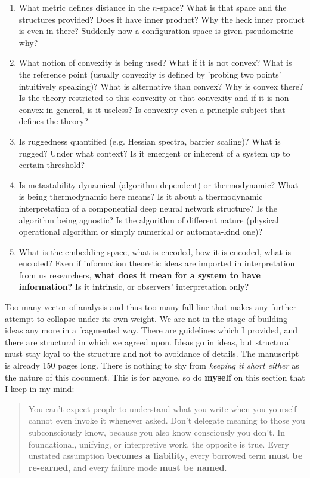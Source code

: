 \begin{enumerate}[itemsep=1pt,topsep=1pt]
    \item What metric defines distance in the $n$-space? What is that space and the structures provided? Does it have inner product? Why the heck inner product is even in there? Suddenly now a configuration space is given pseudometric - why? 
    \item What notion of convexity is being used? What if it is not convex? What is the reference point (usually convexity is defined by 'probing two points' intuitively speaking)? What is alternative than convex? Why is convex there? Is the theory restricted to this convexity or that convexity and if it is non-convex in general, is it useless? Is convexity even a principle subject that defines the theory?
    \item Is ruggedness quantified (e.g. Hessian spectra, barrier scaling)? What is rugged? Under what context? Is it emergent or inherent of a system up to certain threshold?
    \item Is metastability dynamical (algorithm-dependent) or thermodynamic? What is being thermodynamic here means? Is it about a thermodynamic interpretation of a componential deep neural network structure? Is the algorithm being agnostic? Is the algorithm of different nature (physical operational algorithm or simply numerical or automata-kind one)?
    \item What is the embedding space, what is encoded, how it is encoded, what is encoded? Even if information theoretic ideas are imported in interpretation from us researchers, \textbf{what does it mean for a system to have information?} Is it intrinsic, or observers' interpretation only? 
\end{enumerate}

Too many vector of analysis and thus too many fall-line that makes any further attempt to collapse under its own weight. We are not in the stage of building ideas any more in a fragmented way. There are guidelines which I provided, and there are structural in which we agreed upon. Ideas go in ideas, but structural must stay loyal to the structure and not to avoidance of details. The manuscript is already 150 pages long. There is nothing to shy from \textit{keeping it short either} as the nature of this document. This is for anyone, so do \textbf{myself} on this section that I keep in my mind:

\begin{quote}
    You can't expect people to understand what you write when you yourself cannot even invoke it whenever asked. Don't delegate meaning to those you subconsciously know, because you also know consciously you don't. In foundational, unifying, or interpretive work, the opposite is true. Every unstated assumption \textbf{becomes a liability}, every borrowed term \textbf{must be re-earned}, and every failure mode \textbf{must be named}.
\end{quote}

